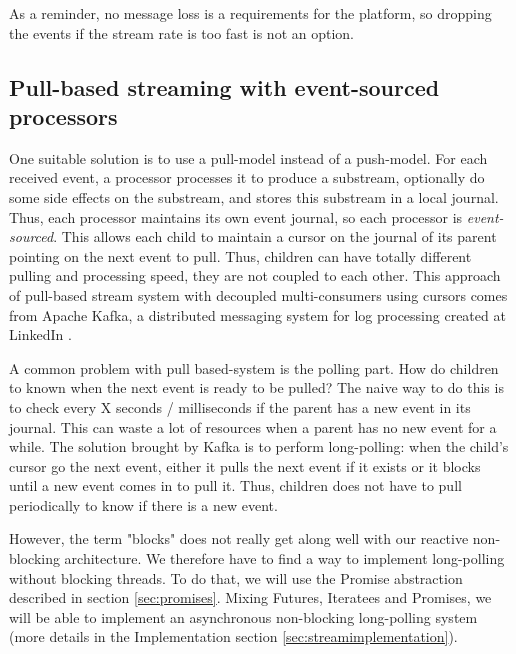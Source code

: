 As a reminder, no message loss is a requirements for the platform, so dropping the events if the stream rate is too fast is not an option.
\\

\subsection{Pull-based streaming with event-sourced processors}

One suitable solution is to use a pull-model instead of a push-model. For each received event, a processor processes it to produce a substream, optionally do some
side effects on the substream, and stores this substream in a local journal. Thus, each processor maintains its own event journal, so each processor is \textit{event-sourced}.
This allows each child to maintain a cursor on the journal of its parent pointing on the next event to pull. Thus, children can have totally different pulling and processing speed, they are not coupled to each other. This approach of pull-based stream system with decoupled multi-consumers using cursors comes from Apache Kafka, a distributed messaging system for log processing created at LinkedIn . 

A common problem with pull based-system is the polling part. How do children to known when the next event is ready to be pulled? The naive way to do this is to check every X seconds / milliseconds if the parent has a new event in its journal. This can waste a lot of resources when a parent has no new event for a while. The solution brought by Kafka is to 
perform long-polling: when the child's cursor go the next event, either it pulls the next event if it exists or it blocks until a new event comes in to pull it. Thus, children does not have to pull periodically to know if there is a new event.

However, the term "blocks" does not really get along well with our reactive non-blocking architecture. We therefore have to find a way to implement long-polling without blocking
threads. To do that, we will use the Promise abstraction described in section \ref{sec:promises}. Mixing Futures, Iteratees and Promises, we will be able to implement
an asynchronous non-blocking long-polling system (more details in the Implementation section \ref{sec:streamimplementation}).

